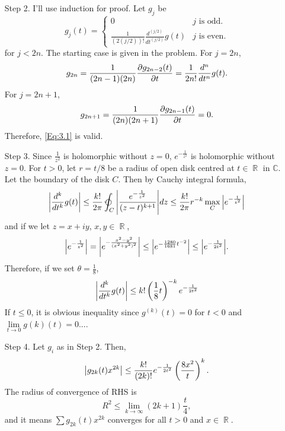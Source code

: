 \documentclass{article}
\DeclareMathOperator{\rr}{\mathbb{R}}
\begin{document}
\begin{enumerate}
\item[Step 2.] I'll use induction for proof. Let $g_j$ be
\begin{equation}\label{Eq:3.1}
g_j(t)=\begin{cases}
0 & j\text{ is odd.} \\
\frac{1}{(2(j/2))!}\frac{d^{(j/2)}}{dt^{(j/2)}}g(t) & j\text{ is even.}
\end{cases}
\end{equation}
for $j<2n$. The starting case is given in the problem. For $j=2n$,
\begin{equation*}
g_{2n}=\frac{1}{(2n-1)(2n)}\pdv{g_{2n-2}(t)}{t}=\frac{1}{2n!}\frac{d^{n}}{dt^{n}}g(t).
\end{equation*}
For $j=2n+1$,
\begin{equation*}
g_{2n+1}=\frac{1}{(2n)(2n+1)}\pdv{g_{2n-1}(t)}{t}=0.
\end{equation*}
Therefore, \eqref{Eq:3.1} is valid.
\item[Step 3.] Since $\frac{1}{z^2}$ is holomorphic without $z= 0$, $e^{-\frac{1}{z^2}}$ is holomorphic without $z=0$.
For $t> 0$, let $r=t/8$ be a radius of open disk centred at $t\in \rr$ in $\mathbb{C}$. Let the boundary of the disk $C$. Then by Cauchy integral formula,
\begin{equation*}
\abs{\frac{d^k}{dt^k}g(t)}\leq \frac{k!}{2\pi}\varointctrclockwise_C \abs{\frac{e^{-\frac{1}{z^2}}}{(z-t)^{k+1}}}dz\leq \frac{k!}{2\pi} r^{-k} \max\limits_C\abs{e^{-\frac{1}{z^2}}}
\end{equation*}
and if we let $z=x+iy$, $x,y\in \rr$,
\begin{equation*}
\abs{e^{-\frac{1}{z^2}}}=\abs{e^{-\frac{x^2-y^2}{(x^2+y^2)^2}}}\leq \abs{e^{-\frac{1280}{1681}t^{-2}}}\leq\abs{e^{-\frac{1}{2t^2}}}.
\end{equation*}
Therefore, if we set $\theta=\frac{1}{8}$,
\begin{equation*}
\abs{\frac{d^k}{dt^k}g(t)}\leq k!\left(\frac{1}{8}t\right)^{-k}e^{-\frac{1}{2t^2}}
\end{equation*}
If $t\leq 0$, it is obvious inequality since $g^(k)(t)=0$ for $t<0$ and $\lim\limits_{t\rightarrow 0} g(k)(t)=0$....
\item[Step 4.] Let $g_i$ as in Step 2. Then,
\begin{equation*}
\abs{g_{2k}(t)x^{2k}}\leq \frac{k!}{(2k)!}e^{-\frac{1}{2t^2}}\left(\frac{8x^2}{t}\right)^k.
\end{equation*}
The radius of convergence of RHS is
\begin{equation*}
R^2\leq \lim\limits_{k\rightarrow \infty}(2k+1)\frac{t}{4},
\end{equation*}
and it means $\sum g_{2k}(t)x^{2k}$ converges for all $t>0$ and $x\in \rr$.


\end{enumerate}
\end{document}
